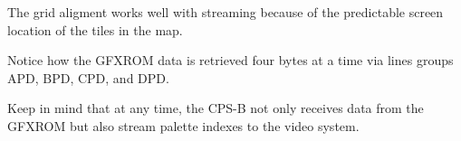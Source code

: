 The grid aligment works well with streaming because of the predictable screen location of the tiles in the map.


Notice how the GFXROM data is retrieved four bytes at a time via lines groups APD, BPD, CPD, and DPD. 

Keep in mind that at any time, the CPS-B not only receives data from the GFXROM but also stream palette indexes to the video system. 















